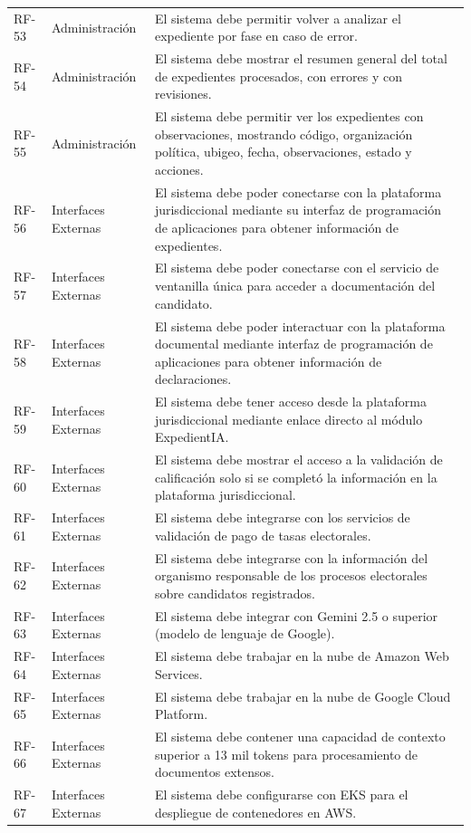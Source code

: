 \documentclass[12pt,a4paper,oneside]{book}
\begin{document}
\begin{longtable}{@{}>{\centering\arraybackslash}p{2cm}
                    >{\centering\arraybackslash}p{3cm}
                    >{\raggedright\arraybackslash}p{10cm}@{}}
RF-53 & Administración & El sistema debe permitir volver a analizar el expediente por fase en caso de error. \\
RF-54 & Administración & El sistema debe mostrar el resumen general del total de expedientes procesados, con errores y con revisiones. \\
RF-55 & Administración & El sistema debe permitir ver los expedientes con observaciones, mostrando código, organización política, ubigeo, fecha, observaciones, estado y acciones. \\
\midrule
RF-56 & Interfaces Externas & El sistema debe poder conectarse con la plataforma jurisdiccional mediante su interfaz de programación de aplicaciones para obtener información de expedientes. \\
RF-57 & Interfaces Externas & El sistema debe poder conectarse con el servicio de ventanilla única para acceder a documentación del candidato. \\
RF-58 & Interfaces Externas & El sistema debe poder interactuar con la plataforma documental mediante interfaz de programación de aplicaciones para obtener información de declaraciones. \\
RF-59 & Interfaces Externas & El sistema debe tener acceso desde la plataforma jurisdiccional mediante enlace directo al módulo ExpedientIA. \\
RF-60 & Interfaces Externas & El sistema debe mostrar el acceso a la validación de calificación solo si se completó la información en la plataforma jurisdiccional. \\
RF-61 & Interfaces Externas & El sistema debe integrarse con los servicios de validación de pago de tasas electorales. \\
RF-62 & Interfaces Externas & El sistema debe integrarse con la información del organismo responsable de los procesos electorales sobre candidatos registrados. \\
RF-63 & Interfaces Externas & El sistema debe integrar con Gemini 2.5 o superior (modelo de lenguaje de Google). \\
RF-64 & Interfaces Externas & El sistema debe trabajar en la nube de Amazon Web Services. \\
RF-65 & Interfaces Externas & El sistema debe trabajar en la nube de Google Cloud Platform. \\
RF-66 & Interfaces Externas & El sistema debe contener una capacidad de contexto superior a 13 mil tokens para procesamiento de documentos extensos. \\
RF-67 & Interfaces Externas & El sistema debe configurarse con EKS para el despliegue de contenedores en AWS. \\
\end{longtable}
\endgroup
\end{document}
